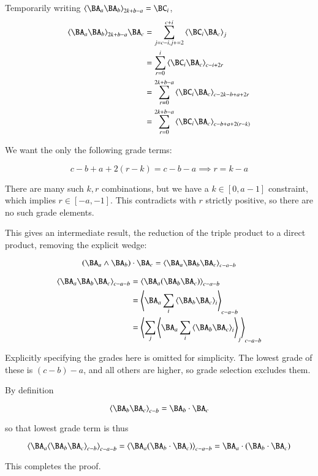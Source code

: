 Temporarily writing $\gpgrade{\BA_a\BA_b}{2k + b - a} = \BC_i$,
\begin{align*}
\gpgrade{\BA_a\BA_b}{2k + b - a} \BA_c
&= \sum_{j=c-i,j+=2}^{c+i} \gpgrade{ \BC_i \BA_c }{j} \\
&= \sum_{r=0}^{i} \gpgrade{ \BC_i \BA_c }{c-i+2r} \\
&= \sum_{r=0}^{2k+b-a} \gpgrade{ \BC_i \BA_c }{c-2k-b+a+2r} \\
&= \sum_{r=0}^{2k+b-a} \gpgrade{ \BC_i \BA_c }{c-b+a +2(r-k)} \\
\end{align*}

We want the only the following grade terms:

\[
c-b+a+2(r-k) = c - b - a
\implies
r=k-a
\]

There are many such $k,r$ combinations, but we have a $k \in [0,a-1]$ constraint, which implies $r \in [-a,-1]$.  This contradicts with $r$ strictly
positive,
so there are no such grade elements.

This gives an intermediate result, the reduction of the triple product to a direct product, removing the explicit wedge:

\begin{equation}
(\BA_a \wedge \BA_b) \cdot \BA_c =
\gpgrade{\BA_a \BA_b \BA_c}{c-a-b}
\end{equation}

\begin{align*}
\gpgrade{\BA_a \BA_b \BA_c}{c-a-b}
&= \gpgrade{\BA_a (\BA_b \BA_c)}{c-a-b} \\
&= \gpgrade{\BA_a \sum_{i}\gpgrade{\BA_b \BA_c}{i}}{c-a-b} \\
&= \gpgrade{\sum_{j}\gpgrade{\BA_a \sum_{i}\gpgrade{\BA_b \BA_c}{i}}{j}}{c-a-b} \\
\end{align*}

Explicitly specifying the grades here is omitted for simplicity.  The lowest grade of these is $(c-b)-a$, and all others are higher, 
so grade selection excludes them.

By definition

\[
\gpgrade{\BA_b \BA_c}{c-b} = \BA_b \cdot \BA_c
\]

so that lowest grade term is thus

\[
\gpgrade{\BA_a \gpgrade{\BA_b \BA_c}{c-b}}{c-a-b}
= \gpgrade{\BA_a (\BA_b \cdot \BA_c)}{c-a-b}
= \BA_a \cdot (\BA_b \cdot \BA_c)
\]

This completes the proof.

